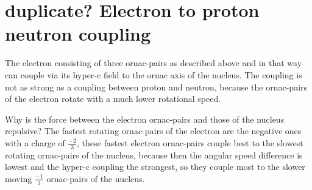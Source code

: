 \section{duplicate? Electron to proton neutron coupling}

The electron consisting of three ornac-pairs as described above and in that way can couple via its hyper-c field to the ornac axis of the nucleus. The coupling is not as strong as a coupling between proton and neutron, because the ornac-pairs of the electron rotate with a much lower rotational speed.

Why is the force between the electron ornac-pairs and those of the nucleus repulsive? The fastest rotating ornac-pairs of the electron are the negative ones with a charge of $\frac{-2}{3}$, these fastest electron ornac-pairs couple best to the slowest rotating ornac-pairs of the nucleus, because then the angular speed difference is lowest and the hyper-c coupling the strongest, so they couple most to the slower moving $\frac{-1}{3}$ ornac-pairs of the nucleus.




